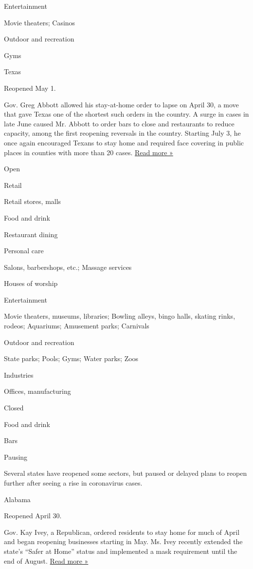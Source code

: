 Entertainment

Movie theaters; Casinos

Outdoor and recreation

Gyms

Texas

Reopened May 1.

Gov. Greg Abbott allowed his stay-at-home order to lapse on April 30, a
move that gave Texas one of the shortest such orders in the country. A
surge in cases in late June caused Mr. Abbott to order bars to close and
restaurants to reduce capacity, among the first reopening reversals in
the country. Starting July 3, he once again encouraged Texans to stay
home and required face covering in public places in counties with more
than 20 cases.
\href{https://www.texastribune.org/2020/06/26/texas-bars-restaurants-coronavirus-greg-abbott/}{Read
more »}

Open

Retail

Retail stores, malls

Food and drink

Restaurant dining

Personal care

Salons, barbershops, etc.; Massage services

Houses of worship

Entertainment

Movie theaters, museums, libraries; Bowling alleys, bingo halls, skating
rinks, rodeos; Aquariums; Amusement parks; Carnivals

Outdoor and recreation

State parks; Pools; Gyms; Water parks; Zoos

Industries

Offices, manufacturing

Closed

Food and drink

Bars

Pausing

Several states have reopened some sectors, but paused or delayed plans
to reopen further after seeing a rise in coronavirus cases.

Alabama

Reopened April 30.

Gov. Kay Ivey, a Republican, ordered residents to stay home for much of
April and began reopening businesses starting in May. Ms. Ivey recently
extended the state's ``Safer at Home'' status and implemented a mask
requirement until the end of August.
\href{https://www.wsfa.com/2020/07/29/gov-ivey-update-public-states-repsonse-covid-/}{Read
more »}

